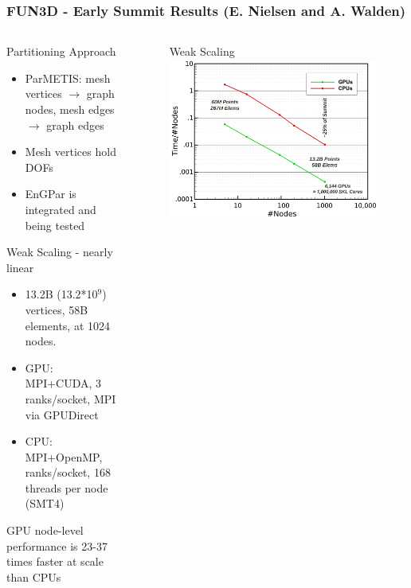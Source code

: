 \documentclass[aspectratio=169]{beamer}
\begin{document}
\begin{frame}
  \frametitle{FUN3D - Early Summit Results (E. Nielsen and A. Walden)}
  \begin{columns}
    \begin{column}{0.5\textwidth}
      Partitioning Approach
      \begin{itemize}
        \item ParMETIS: mesh vertices $\rightarrow$ graph nodes,
          mesh edges $\rightarrow$ graph edges
        \item Mesh vertices hold DOFs
        \item EnGPar is integrated and being tested
      \end{itemize}
      Weak Scaling - nearly linear
      \begin{itemize}
        \item 13.2B (13.2*10$^9$) vertices, 58B elements, at 1024 nodes.
        \item GPU: MPI+CUDA, 3 ranks/socket, MPI via GPUDirect
        \item CPU: MPI+OpenMP, ranks/socket, 168 threads per node (SMT4)
      \end{itemize}
      GPU node-level performance is 23-37 times faster at scale than CPUs
    \end{column}
    \begin{column}{0.5\textwidth}
      \begin{figure}
        \centering
        Weak Scaling \\
        \includegraphics[width=\textwidth]{figures/fun3d-summit.png}
      \end{figure}
    \end{column}
  \end{columns}
\end{frame}
\end{document}
